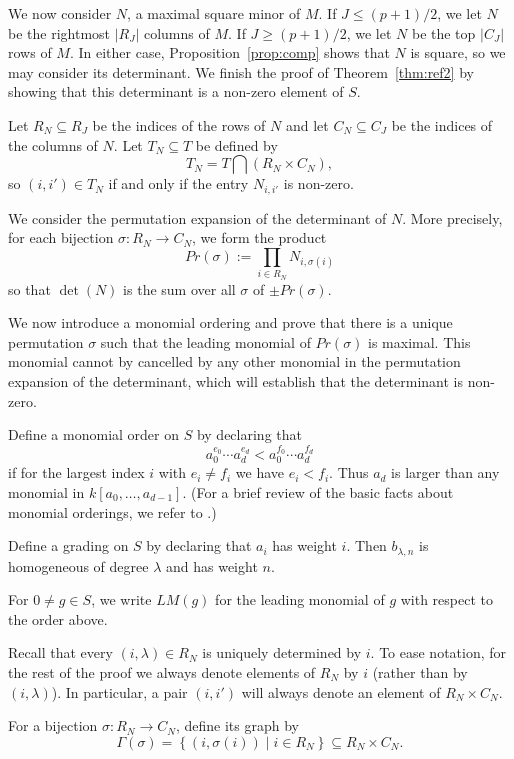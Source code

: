 \documentclass[12pt,reqno]{amsart}
\newcommand{\bry}[1]{{\color{red} \sf $\bigstar\bigstar$ [#1]}}
\numberwithin{equation}{section}
\theoremstyle{plain}
\theoremstyle{definition}
\theoremstyle{remark}
\numberwithin{equation}{section}
\newcommand{\<}{\langle}
\renewcommand{\>}{\rangle}
\begin{document}
We now consider $N$, a maximal square minor of $M$.  If
$J\le(p+1)/2$, %
we let $N$ be the rightmost $|R_J|$ columns of $M$.  If $J\ge(p+1)/2$,
we let $N$ be the top $|C_J|$ rows of $M$.  In either case,
Proposition~\ref{prop:comp} shows that $N$ is square, so we may
consider its determinant.  We finish the proof of
Theorem~\ref{thm:ref2} by showing that this determinant is a non-zero
element of $S$.

Let $R_N\subseteq R_J$ be the indices of the rows of $N$ and let $C_N\subseteq
C_J$ be the indices of the columns of $N$.  Let $T_N\subseteq T$ be
defined by
\[T_N=T\bigcap\left(R_N\times C_N\right),\]
so $(i,i')\in T_N$ if and only if the entry $N_{i,i'}$ is non-zero.

We consider the permutation expansion of the determinant of $N$.
More precisely, for each bijection $\sigma:R_N\to C_N$, we form the
product
\[Pr(\sigma):=\prod_{i\in R_N} N_{i,\sigma(i)}\]
so that $\det(N)$ is the sum over all $\sigma$ of $\pm Pr(\sigma)$.

We now introduce a monomial ordering and prove that there is a unique
permutation $\sigma$ such that the leading monomial of $Pr(\sigma)$ is
maximal.  This monomial cannot by cancelled by any other monomial in
the permutation expansion of the determinant,
which will establish that the determinant is non-zero.

Define a monomial order on $S$
by declaring that
\[a_0^{e_0}\cdots a_d^{e_d}<a_0^{f_0}\cdots a_d^{f_d}\]
if for the largest index $i$ with $e_i\neq f_i$ we have $e_i<f_i$.
Thus $a_d$ is larger than any monomial in $k[a_0,\dots,a_{d-1}]$.
(For a brief review of the basic facts about monomial orderings, we
refer to \cite[Ch.~2, \S2]{CoxLittleOsheaIVA}.)

Define a grading on $S$ by declaring that $a_i$ has weight $i$.  Then
$b_{\lambda,n}$ is homogeneous of degree $\lambda$ and has weight $n$.

For $0\neq g\in S$,
we write $LM(g)$ for the leading monomial of $g$
with respect to the order above.

Recall that every $(i,\lambda)\in R_N$ is uniquely determined by $i$.
To ease notation, for the rest of the proof we always denote elements
of $R_N$ by $i$ (rather than by $(i,\lambda)$).  In particular, a pair
$(i,i')$ will always denote an element of $R_N\times C_N$.

For a bijection $\sigma:R_N\to C_N$, define its graph by
\[\Gamma(\sigma)=\left\{(i,\sigma(i))
    \mid i\in R_N\right\} \subseteq R_N\times C_N.\]
\end{document}
